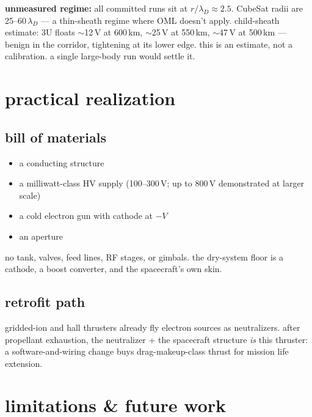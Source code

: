 \documentclass[11pt]{article}
\begin{document}
\textbf{unmeasured regime:} all committed runs sit at
$r/\lambda_D \approx 2.5$.  CubeSat radii are 25--60\,$\lambda_D$ --- a
thin-sheath regime where OML doesn't apply.  child-sheath estimate: 3U
floats $\sim$12\,V at 600\,km, $\sim$25\,V at 550\,km, $\sim$47\,V at
500\,km --- benign in the corridor, tightening at its lower edge.  this is an
estimate, not a calibration.  a single large-body run would settle it.

\section{practical realization}

\subsection{bill of materials}
\begin{itemize}
  \item a conducting structure
  \item a milliwatt-class HV supply (100--300\,V; up to 800\,V demonstrated at
        larger scale)
  \item a cold electron gun with cathode at $-V$
  \item an aperture
\end{itemize}
no tank, valves, feed lines, RF stages, or gimbals.  the dry-system floor is a
cathode, a boost converter, and the spacecraft's own skin.

\subsection{retrofit path}

gridded-ion and hall thrusters already fly electron sources as neutralizers.
after propellant exhaustion, the neutralizer + the spacecraft structure
\emph{is} this thruster: a software-and-wiring change buys drag-makeup-class
thrust for mission life extension.

\section{limitations \& future work}
\end{document}
